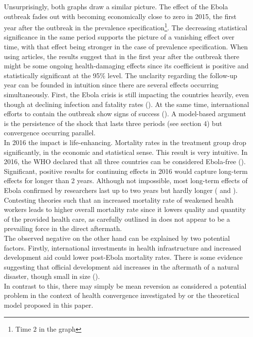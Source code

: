 \documentclass{article}
\begin{document}
Unsurprisingly, both graphs draw a similar picture. The effect of the Ebola outbreak fades out with becoming economically close to zero in 2015, the first year after the outbreak in the prevalence specification\footnote{Time $2$ in the graph}. The decreasing statistical significance in the same period supports the picture of a vanishing effect over time, with that effect being stronger in the case of prevalence specification. When using articles, the results suggest that in the first year after the outbreak there might be some ongoing health-damaging effects since its coefficient is positive and statistically significant at the 95\% level. The unclarity regarding the follow-up year can be founded in intuition since there are several effects occurring simultaneously. First, the Ebola crisis is still impacting the countries heavily, even though at declining infection and fatality rates (\cite{world2016ebola}). At the same time, international efforts to contain the outbreak show signs of success (\cite{benton2015international}). A model-based argument is the persistence of the shock that lasts three periods (see section 4) but convergence occurring parallel.\\
In 2016 the impact is life-enhancing. Mortality rates in the treatment group drop significantly, in the economic and statistical sense. This result is very intuitive. In 2016, the WHO declared that all three countries can be considered Ebola-free (\cite{world2016latest}). Significant, positive results for continuing effects in 2016 would capture long-term effects for longer than 2 years. Although not impossible, most long-term effects of Ebola confirmed by researchers last up to two years but hardly longer (\cite{clark2015long} and \cite{rowe1999clinical}). Contesting theories such that an increased mortality rate of weakened health workers leads to higher overall mortality rate since it lowers quality and quantity of the provided health care, as carefully outlined in \cite{evans2015next} does not appear to be a prevailing force in the direct aftermath. \\
The observed negative on the other hand can be explained by two potential factors. Firstly, international investments in health infrastructure and increased development aid could lower post-Ebola mortality rates. There is some evidence suggesting that official development aid increases in the aftermath of a natural disaster, though small in size (\cite{becerra2014foreign}). \\
In contrast to this, there may simply be mean reversion as considered a potential problem in the context of health convergence investigated by \cite{jayachandran2009life} or the theoretical model proposed in this paper. \\
\end{document}

